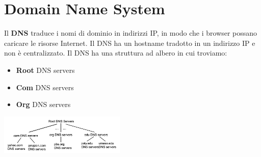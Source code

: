 \documentclass{article}
\begin{document}
\section{Domain Name System}

Il \textbf{DNS} traduce i nomi di dominio in indirizzi IP, in modo che i browser possano caricare le risorse Internet. Il DNS ha un hostname tradotto in un indirizzo IP e non è centralizzato.
Il DNS ha una struttura ad albero in cui troviamo:
\begin{itemize}
  \item \textbf{Root} DNS servers
  \item \textbf{Com} DNS servers
  \item \textbf{Org} DNS servers
\end{itemize}
\begin{center}
\includegraphics[width=6cm]{img/dnsScale.png}
\end{center}
\end{document}
